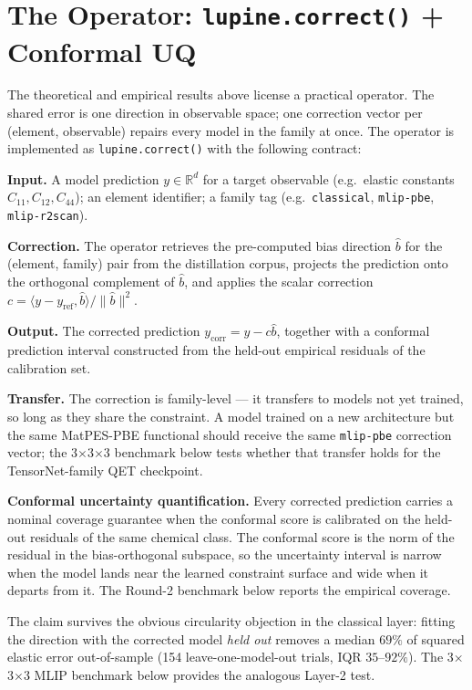 \documentclass[11pt]{article}
\begin{document}
\section{The Operator: \texttt{lupine.correct()} + Conformal UQ}
\label{sec:operator}

The theoretical and empirical results above license a practical operator. The
shared error is one direction in observable space; one correction vector per
(element, observable) repairs every model in the family at once. The operator
is implemented as \texttt{lupine.correct()} with the following contract:

\textbf{Input.} A model prediction $y \in \mathbb{R}^d$ for a target
observable (e.g.\ elastic constants $C_{11}, C_{12}, C_{44}$); an element
identifier; a family tag (e.g.\ \texttt{classical}, \texttt{mlip-pbe},
\texttt{mlip-r2scan}).

\textbf{Correction.} The operator retrieves the pre-computed bias direction
$\hat b$ for the (element, family) pair from the distillation corpus, projects
the prediction onto the orthogonal complement of $\hat b$, and applies the
scalar correction $c = \langle y - y_{\mathrm{ref}}, \hat b \rangle / \|\hat b\|^2$.

\textbf{Output.} The corrected prediction $y_{\mathrm{corr}} = y - c \hat b$,
together with a conformal prediction interval \citep{shafer2008,angelopoulos2021}
constructed from the held-out empirical residuals of the calibration set.

\textbf{Transfer.} The correction is family-level --- it transfers to models
not yet trained, so long as they share the constraint. A model trained on a
new architecture but the same MatPES-PBE functional should receive the same
\texttt{mlip-pbe} correction vector; the 3$\times$3$\times$3 benchmark below
tests whether that transfer holds for the TensorNet-family QET checkpoint.

\textbf{Conformal uncertainty quantification.} Every corrected prediction carries
a nominal coverage guarantee when the conformal score is calibrated on the
held-out residuals of the same chemical class. The conformal score is the norm
of the residual in the bias-orthogonal subspace, so the uncertainty interval is
narrow when the model lands near the learned constraint surface and wide when it
departs from it. The Round-2 benchmark below reports the empirical coverage.

The claim survives the obvious circularity objection in the classical layer:
fitting the direction with the corrected model \emph{held out} removes a median
$69\%$ of squared elastic error out-of-sample (154 leave-one-model-out trials,
IQR $35$--$92\%$). The 3$\times$3$\times$3 MLIP benchmark below provides the
analogous Layer-2 test.
\end{document}
